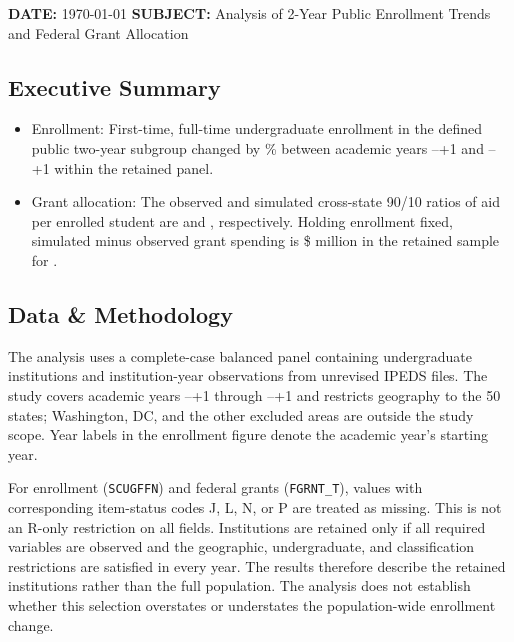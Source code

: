 \documentclass[12pt]{article}
\newcommand{\AcademicYear}[1]{#1--\number\numexpr#1+1\relax}
\begin{document}
\noindent
\textbf{DATE:} \today \newline
\textbf{SUBJECT:} Analysis of 2-Year Public Enrollment Trends and Federal Grant Allocation\par
\normalsize

\subsection*{Executive Summary}
\begin{itemize}
    \item Enrollment: First-time, full-time undergraduate enrollment in the
    defined public two-year subgroup changed by \EnrollmentChangePct{}\%
    between academic years \AcademicYear{\StudyStartYear} and
    \AcademicYear{\StudyEndYear} within the retained panel.
    \item Grant allocation: The observed and simulated cross-state 90/10
    ratios of aid per enrolled student are \CurrentAidRatio{} and
    \SimulatedAidRatio{}, respectively. Holding enrollment fixed, simulated
    minus observed grant spending is \$\BudgetChangeMillions{} million in
    the retained sample for \AidAcademicYear{}.
\end{itemize}

\subsection*{Data \& Methodology}
The analysis uses a complete-case balanced panel containing
\PanelInstitutions{} undergraduate institutions and \PanelRows{}
institution-year observations from unrevised IPEDS files. The study covers
academic years \AcademicYear{\StudyStartYear} through
\AcademicYear{\StudyEndYear} and restricts geography to the 50 states;
Washington, DC, and the other excluded areas are outside the study scope.
Year labels in the enrollment figure denote the academic year's starting year.

For enrollment (\texttt{SCUGFFN}) and federal grants (\texttt{FGRNT\_T}),
values with corresponding item-status codes J, L, N, or P are treated as
missing. This is not an R-only restriction on all fields. Institutions are
retained only if all required variables are observed and the geographic,
undergraduate, and classification restrictions are satisfied in every year.
The results therefore describe the retained institutions rather than the full
population. The analysis does not establish whether this selection overstates
or understates the population-wide enrollment change.
\end{document}

